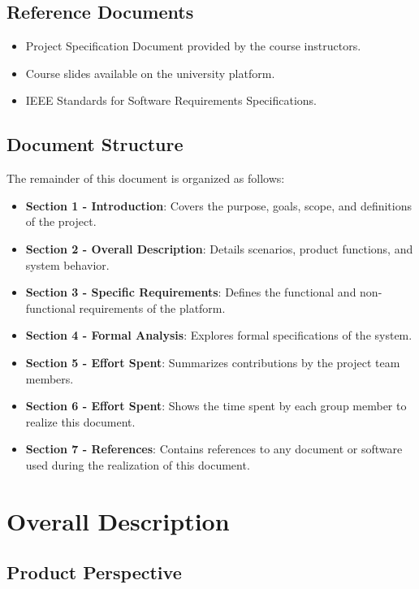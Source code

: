\documentclass[12pt]{article}
\numberwithin{figure}{section}
\numberwithin{table}{section}
\begin{document}
\subsection{Reference Documents}
\begin{itemize}
    \item Project Specification Document provided by the course instructors.
    \item Course slides available on the university platform.
    \item IEEE Standards for Software Requirements Specifications.
\end{itemize}

\subsection{Document Structure}
The remainder of this document is organized as follows:
\begin{itemize}
    \item \textbf{Section 1 - Introduction}: Covers the purpose, goals, scope, and definitions of the project.
    \item \textbf{Section 2 - Overall Description}: Details scenarios, product functions, and system behavior.
    \item \textbf{Section 3 - Specific Requirements}: Defines the functional and non-functional requirements of the platform.
    \item \textbf{Section 4 - Formal Analysis}: Explores formal specifications of the system.
    \item \textbf{Section 5 - Effort Spent}: Summarizes contributions by the project team members.
    \item \textbf{Section 6 - Effort Spent}: Shows the time spent by each group member to realize this document.
    \item \textbf{Section 7 - References}: Contains references to any document or software used during the realization of this document.
\end{itemize}

\newpage

\section{Overall Description}

\subsection{Product Perspective}
\end{document}
